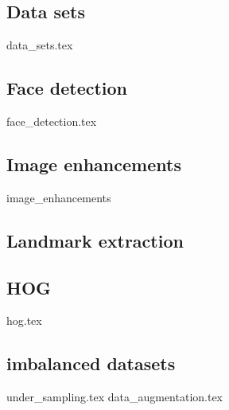 \subsection{Data sets}
{data_sets.tex}

\subsection{Face detection}
{face_detection.tex}

\subsection{Image enhancements}
{image_enhancements}

\subsection{Landmark extraction}

\subsection{HOG}
{hog.tex}

\subsection{imbalanced datasets}
{under_sampling.tex}
{data_augmentation.tex}

